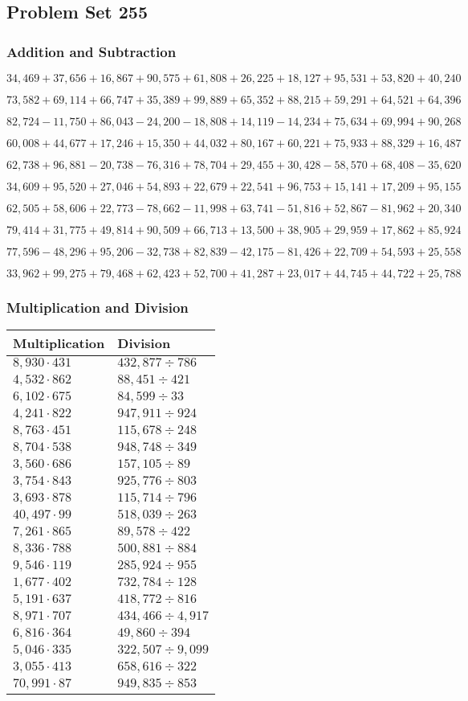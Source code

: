 \hypertarget{problem-set-255}{%
\subsection{Problem Set 255}\label{problem-set-255}}

\hypertarget{addition-and-subtraction}{%
\subsubsection{Addition and
Subtraction}\label{addition-and-subtraction}}

\(34,469+37,656+16,867+90,575+61,808+26,225+18,127+95,531+53,820+40,240\)

\(73,582+69,114+66,747+35,389+99,889+65,352+88,215+59,291+64,521+64,396\)

\(82,724-11,750+86,043-24,200-18,808+14,119-14,234+75,634+69,994+90,268\)

\(60,008+44,677+17,246+15,350+44,032+80,167+60,221+75,933+88,329+16,487\)

\(62,738+96,881-20,738-76,316+78,704+29,455+30,428-58,570+68,408-35,620\)

\(34,609+95,520+27,046+54,893+22,679+22,541+96,753+15,141+17,209+95,155\)

\(62,505+58,606+22,773-78,662-11,998+63,741-51,816+52,867-81,962+20,340\)

\(79,414+31,775+49,814+90,509+66,713+13,500+38,905+29,959+17,862+85,924\)

\(77,596-48,296+95,206-32,738+82,839-42,175-81,426+22,709+54,593+25,558\)

\(33,962+99,275+79,468+62,423+52,700+41,287+23,017+44,745+44,722+25,788\)

\hypertarget{multiplication-and-division}{%
\subsubsection{Multiplication and
Division}\label{multiplication-and-division}}

\begin{longtable}[]{@{}ll@{}}
\toprule
Multiplication & Division\tabularnewline
\midrule
\endhead
\(8,930\cdot431\) & \(432,877÷786\)\tabularnewline
\(4,532\cdot862\) & \(88,451÷421\)\tabularnewline
\(6,102\cdot675\) & \(84,599÷33\)\tabularnewline
\(4,241\cdot822\) & \(947,911÷924\)\tabularnewline
\(8,763\cdot451\) & \(115,678÷248\)\tabularnewline
\(8,704\cdot538\) & \(948,748÷349\)\tabularnewline
\(3,560\cdot686\) & \(157,105÷89\)\tabularnewline
\(3,754\cdot843\) & \(925,776÷803\)\tabularnewline
\(3,693\cdot878\) & \(115,714÷796\)\tabularnewline
\(40,497\cdot99\) & \(518,039÷263\)\tabularnewline
\(7,261\cdot865\) & \(89,578÷422\)\tabularnewline
\(8,336\cdot788\) & \(500,881÷884\)\tabularnewline
\(9,546\cdot119\) & \(285,924÷955\)\tabularnewline
\(1,677\cdot402\) & \(732,784÷128\)\tabularnewline
\(5,191\cdot637\) & \(418,772÷816\)\tabularnewline
\(8,971\cdot707\) & \(434,466÷4,917\)\tabularnewline
\(6,816\cdot364\) & \(49,860÷394\)\tabularnewline
\(5,046\cdot335\) & \(322,507÷9,099\)\tabularnewline
\(3,055\cdot413\) & \(658,616÷322\)\tabularnewline
\(70,991\cdot87\) & \(949,835÷853\)\tabularnewline
\bottomrule
\end{longtable}
